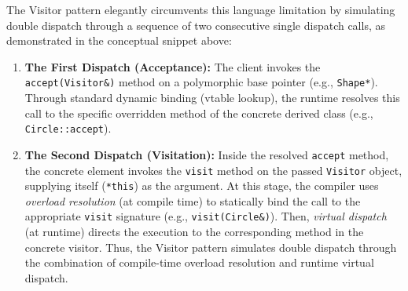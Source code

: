 The Visitor pattern elegantly circumvents this language limitation by simulating double dispatch through a sequence of two consecutive single dispatch calls, as demonstrated in the conceptual snippet above:
\begin{enumerate}
    \item \textbf{The First Dispatch (Acceptance):} The client invokes the \texttt{accept(Visitor\&)} method on a polymorphic base pointer (e.g., \texttt{Shape*}). Through standard dynamic binding (vtable lookup), the runtime resolves this call to the specific overridden method of the concrete derived class (e.g., \texttt{Circle::accept}).
    \item \textbf{The Second Dispatch (Visitation):} Inside the resolved \texttt{accept} method, the concrete element invokes the \texttt{visit} method on the passed \texttt{Visitor} object, supplying itself (\texttt{*this}) as the argument. At this stage, the compiler uses \textit{overload resolution} (at compile time) to statically bind the call to the appropriate \texttt{visit} signature (e.g., \texttt{visit(Circle\&)}). Then, \textit{virtual dispatch} (at runtime) directs the execution to the corresponding method in the concrete visitor. Thus, the Visitor pattern simulates double dispatch through the combination of compile-time overload resolution and runtime virtual dispatch.
\end{enumerate}
